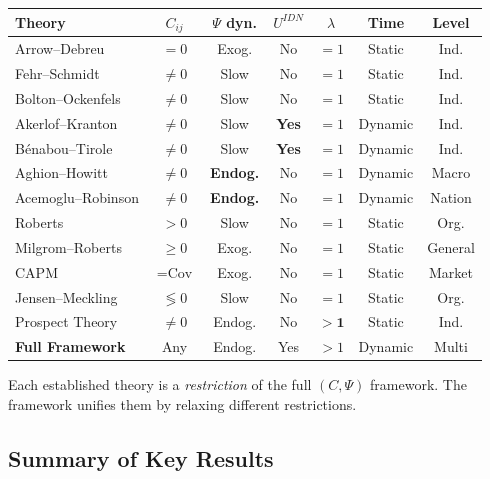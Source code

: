 \begin{center}
\renewcommand{\arraystretch}{1.3}
\small
\begin{tabular}{lcccccc}
\hline
\textbf{Theory} & $C_{ij}$ & $\Psi$ dyn. & $U^{IDN}$ & $\lambda$ & Time & Level \\
\hline
Arrow--Debreu & $= 0$ & Exog. & No & $= 1$ & Static & Ind. \\
Fehr--Schmidt & $\neq 0$ & Slow & No & $= 1$ & Static & Ind. \\
Bolton--Ockenfels & $\neq 0$ & Slow & No & $= 1$ & Static & Ind. \\
Akerlof--Kranton & $\neq 0$ & Slow & \textbf{Yes} & $= 1$ & Dynamic & Ind. \\
Bénabou--Tirole & $\neq 0$ & Slow & \textbf{Yes} & $= 1$ & Dynamic & Ind. \\
Aghion--Howitt & $\neq 0$ & \textbf{Endog.} & No & $= 1$ & Dynamic & Macro \\
Acemoglu--Robinson & $\neq 0$ & \textbf{Endog.} & No & $= 1$ & Dynamic & Nation \\
Roberts & $> 0$ & Slow & No & $= 1$ & Static & Org. \\
Milgrom--Roberts & $\geq 0$ & Exog. & No & $= 1$ & Static & General \\
CAPM & $= \text{Cov}$ & Exog. & No & $= 1$ & Static & Market \\
Jensen--Meckling & $\lessgtr 0$ & Slow & No & $= 1$ & Static & Org. \\
Prospect Theory & $\neq 0$ & Endog. & No & $\mathbf{> 1}$ & Static & Ind. \\
\hline
\textbf{Full Framework} & Any & Endog. & Yes & $> 1$ & Dynamic & Multi \\
\hline
\end{tabular}
\end{center}

Each established theory is a \emph{restriction} of the full $(C, \Psi)$ framework.
The framework unifies them by relaxing different restrictions.



\subsection{Summary of Key Results}
\label{sec:A-results}


